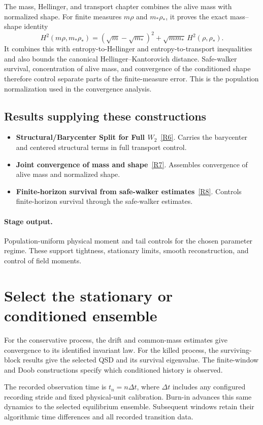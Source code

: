 \documentclass[11pt,a4paper]{article}
\begin{document}
The mass, Hellinger, and transport chapter combines the alive mass with normalized shape. For finite measures \(m\rho\) and \(m_*\rho_*\), it proves the exact mass--shape identity
\[
H^2(m\rho,m_*\rho_*)
=(\sqrt m-\sqrt{m_*})^2+\sqrt{mm_*}\,H^2(\rho,\rho_*).
\]
It combines this with entropy-to-Hellinger and entropy-to-transport inequalities and also bounds the canonical Hellinger--Kantorovich distance. Safe-walker survival, concentration of alive mass, and convergence of the conditioned shape therefore control separate parts of the finite-measure error. This is the population normalization used in the convergence analysis.
\subsection*{Results supplying these constructions}
\begin{itemize}
\item \textbf{Structural/Barycenter Split for Full \(W_2\)}~\hyperref[src:thm-full-w2-split]{[R6]}. Carries the barycenter and centered structural terms in full transport control.
\item \textbf{Joint convergence of mass and shape}~\hyperref[src:thm-hk-convergence-main-assembly]{[R7]}. Assembles convergence of alive mass and normalized shape.
\item \textbf{Finite-horizon survival from safe-walker estimates}~\hyperref[src:thm-exponential-survival]{[R8]}. Controls finite-horizon survival through the safe-walker estimates.
\end{itemize}
\paragraph{Stage output.} Population-uniform physical moment and tail controls for the chosen parameter regime. These support tightness, stationary limits, smooth reconstruction, and control of field moments.

\section{Select the stationary or conditioned ensemble}
\label{stage:4}
For the conservative process, the drift and common-mass estimates give convergence to its identified invariant law. For the killed process, the surviving-block results give the selected QSD and its survival eigenvalue. The finite-window and Doob constructions specify which conditioned history is observed.

The recorded observation time is \(t_n=n\Delta t\), where \(\Delta t\) includes any configured recording stride and fixed physical-unit calibration. Burn-in advances this same dynamics to the selected equilibrium ensemble. Subsequent windows retain their algorithmic time differences and all recorded transition data.
\end{document}
